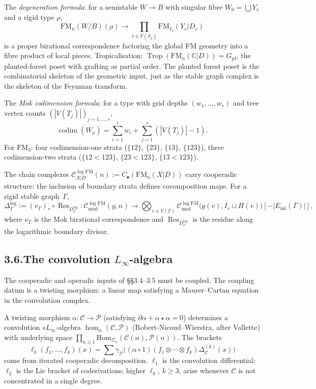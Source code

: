\documentclass[11pt,reqno]{amsart}
\theoremstyle{definition}
\theoremstyle{remark}
\providecommand{\cC}{\mathcal{C}}
\providecommand{\cP}{\mathcal{P}}
\providecommand{\Hom}{\mathrm{Hom}}
\numberwithin{equation}{section}
\begin{document}
The \emph{degeneration formula}: for a semistable $W\to B$ with
singular fibre $W_0=\bigcup Y_v$ and a rigid type $\rho$,
\[
\mathrm{FM}_n(W/B)(\rho)\longrightarrow\prod_{v\in V(S_\rho)}\mathrm{FM}_{I_v}(Y_v|D_v)
\]
is a proper birational correspondence factoring the global FM
geometry into a fibre product of local pieces. Tropicalisation:
$\operatorname{Trop}(\mathrm{FM}_n(\mathbb C|D))=G_{\mathrm{pf}}$, the
planted-forest poset with grafting as partial order. The planted
forest poset is the combinatorial skeleton of the geometric input,
just as the stable graph complex is the skeleton of the Feynman
transform.

The \emph{Mok codimension formula}: for a type with grid depths
$(w_1,\ldots,w_r)$ and tree vertex counts $(|V(T_j)|)_{j=1,\ldots,s}$,
\[
\operatorname{codim}(W_\rho)=\sum_{i=1}^r w_i+\sum_{j=1}^s(|V(T_j)|-1).
\]
For $\mathrm{FM}_3$: four codimension-one strata ($\{12\}$, $\{23\}$,
$\{13\}$, $\{123\}$), three codimension-two strata
($\{12{<}123\}$, $\{23{<}123\}$, $\{13{<}123\}$).

The chain complexes $\cC^{\log\mathrm{FM}}_{X|D}(n):=C_\bullet(\mathrm{FM}_n(X|D))$
carry cooperadic structure: the inclusion of boundary strata defines
cocomposition maps. For a rigid stable graph~$\Gamma$,
\[
\Delta^{\log}_\Gamma:=(\nu_\Gamma)_*\circ\operatorname{Res}_{D^{\log}_\Gamma}\colon\cC^{\log\mathrm{FM}}_{\mathrm{mod}}(g,n)\to\bigotimes_{v\in V(\Gamma)}\cC^{\log\mathrm{FM}}_{\mathrm{mod}}\bigl(g(v),I_v\sqcup H(v)\bigr)[-|E_{\mathrm{int}}(\Gamma)|],
\]
where $\nu_\Gamma$ is the Mok birational correspondence and
$\operatorname{Res}_{D^{\log}_\Gamma}$ is the residue along the
logarithmic boundary divisor.

\subsection*{3.6.\enspace The convolution $L_\infty$-algebra}

The cooperadic and operadic inputs of \S\S3.4--3.5 must be coupled.
The coupling datum is a twisting morphism: a linear map satisfying a
Maurer--Cartan equation in the convolution complex.

A twisting morphism $\alpha\colon\cC\to\cP$ (satisfying
$\partial\alpha+\alpha\star\alpha=0$) determines a convolution
$sL_\infty$-algebra $\operatorname{hom}_\alpha(\cC,\cP)$
(Robert-Nicoud--Wierstra, after Vallette) with underlying space
$\prod_{n\ge 1}\Hom_{\Sigma_n}(\cC(n),\cP(n))$. The brackets
\[
\ell_k(f_1,\ldots,f_k)(x)=\sum\gamma_\cP\bigl((\alpha\circ 1)(f_1\otimes\cdots\otimes f_k)\Delta^{(k)}_\cC(x)\bigr)
\]
come from iterated cooperadic decomposition. $\ell_1$ is the
convolution differential; $\ell_2$ is the Lie bracket of
coderivations; higher $\ell_k$, $k\ge 3$, arise whenever $\cC$ is not
concentrated in a single degree.
\end{document}

